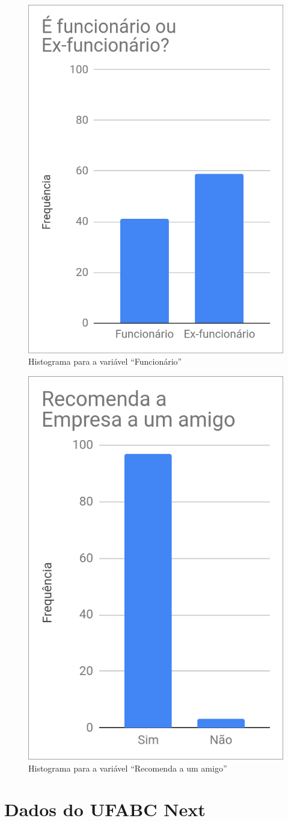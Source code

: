 	\begin{figure}[H]
		\centering
		\caption{Histograma para a variável ``Funcionário''}
		\label{fig:vinculo}
		\includegraphics[width=0.5\linewidth]{img/funcionario}
	\end{figure}

	\begin{figure}[H]
		\centering
		\caption{Histograma para a variável ``Recomenda a um amigo''}
		\label{fig:recomendacao}
		\includegraphics[width=0.5\linewidth]{img/recomenda_amigo}
	\end{figure}

	\section{Dados do UFABC Next}
	
